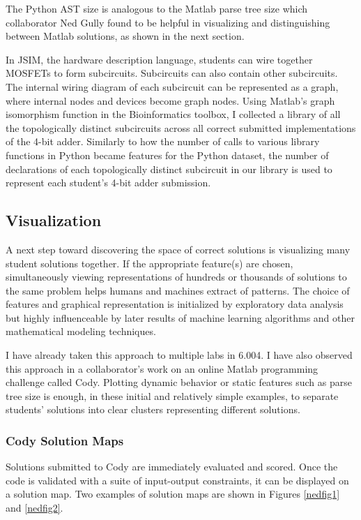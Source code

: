 \documentclass[12pt]{article}
\begin{document}
The Python AST size is analogous to the Matlab parse tree size which collaborator Ned Gully found to be helpful in visualizing and distinguishing between Matlab solutions, as shown in the next section.

In JSIM, the hardware description language, students can wire together MOSFETs to form subcircuits. Subcircuits can also contain other subcircuits. The internal wiring diagram of each subcircuit can be represented as a graph, where internal nodes and devices become graph nodes. Using Matlab's graph isomorphism function in the Bioinformatics toolbox, I collected a library of all the topologically distinct subcircuits across all correct submitted implementations of the 4-bit adder. Similarly to how the number of calls to various library functions in Python became features for the Python dataset, the number of declarations of each topologically distinct subcircuit in our library is used to represent each student's 4-bit adder submission.


\subsection{Visualization}

A next step toward discovering the space of correct solutions is visualizing many student solutions together. If the appropriate feature(s) are chosen, simultaneously viewing representations of hundreds or thousands of solutions to the same problem helps humans and machines extract of patterns. The choice of features and graphical representation is initialized by exploratory data analysis but highly influenceable by later results of machine learning algorithms and other mathematical modeling techniques. 

I have already taken this approach to multiple labs in 6.004. I have also observed this approach in a collaborator's work on an online Matlab programming challenge called Cody. Plotting dynamic behavior or static features such as parse tree size is enough, in these initial and relatively simple examples, to separate students' solutions into clear clusters representing different solutions. %

\subsubsection{Cody Solution Maps}
Solutions submitted to Cody are immediately evaluated and scored. Once the code is validated with a suite of input-output constraints, it can be displayed on a solution map. Two examples of solution maps are shown in Figures \ref{nedfig1} and \ref{nedfig2}. 
 
\end{document}
